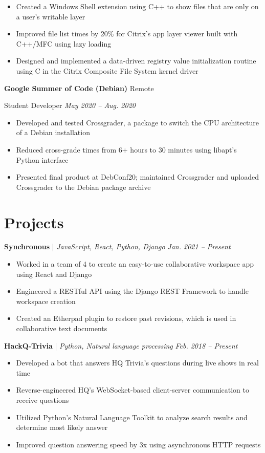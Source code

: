 \documentclass[11pt,letterpaper]{article}
\newcommand{\resumeItemListStart}{
    \begin{itemize}[itemsep=1pt, parsep=0pt, topsep=0pt]
}
\newcommand{\resumeItemListEnd}{
    \end{itemize}
}
\begin{document}
\resumeItemListStart
	\item Created a Windows Shell extension using C++ to show files that are only on a user's writable layer
	\item Improved file list times by 20\% for Citrix's app layer viewer built with C++/MFC using lazy loading
	\item Designed and implemented a data-driven registry value initialization routine using C in the Citrix Composite File System kernel driver
\resumeItemListEnd

\textbf{Google Summer of Code (Debian)} \hfill Remote

Student Developer \hfill \textit{May 2020 -- Aug. 2020}

\resumeItemListStart
	\item Developed and tested Crossgrader, a package to switch the CPU architecture of a Debian installation
	\item Reduced cross-grade times from 6+ hours to 30 minutes using libapt's Python interface
    \item Presented final product at DebConf20; maintained Crossgrader and uploaded Crossgrader to the Debian package archive
\resumeItemListEnd

\section{Projects}

\textbf{Synchronous} | \emph{JavaScript, React, Python, Django} \hfill \textit{Jan. 2021 -- Present}

\resumeItemListStart
    \item Worked in a team of 4 to create an easy-to-use collaborative workspace app using React and Django
    \item Engineered a RESTful API using the Django REST Framework to handle workspace creation
    \item Created an Etherpad plugin to restore past revisions, which is used in collaborative text documents
\resumeItemListEnd

\textbf{HackQ-Trivia} | \emph{Python, Natural language processing} \hfill \textit{Feb. 2018 -- Present}

\resumeItemListStart
    \item Developed a bot that answers HQ Trivia's questions during live shows in real time
	\item Reverse-engineered HQ's WebSocket-based client-server communication to receive questions
	\item Utilized Python's Natural Language Toolkit to analyze search results and determine most likely answer
	\item Improved question answering speed by 3x using asynchronous HTTP requests
\resumeItemListEnd
\end{document}
